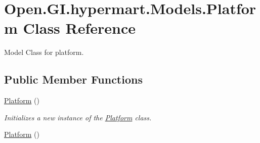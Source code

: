 \hypertarget{class_open_1_1_g_i_1_1hypermart_1_1_models_1_1_platform}{}\section{Open.\+G\+I.\+hypermart.\+Models.\+Platform Class Reference}
\label{class_open_1_1_g_i_1_1hypermart_1_1_models_1_1_platform}


Model Class for platform.  


\subsection*{Public Member Functions}
\begin{DoxyCompactItemize}
\item 
\hyperlink{class_open_1_1_g_i_1_1hypermart_1_1_models_1_1_platform_a6c806705f4dc1171773096a5249a1563}{Platform} ()
\begin{DoxyCompactList}\small\item\em Initializes a new instance of the \hyperlink{class_open_1_1_g_i_1_1hypermart_1_1_models_1_1_platform}{Platform} class. \end{DoxyCompactList}\item 
\hyperlink{class_open_1_1_g_i_1_1hypermart_1_1_models_1_1_platform_a6c806705f4dc1171773096a5249a1563}{Platform} ()
\end{DoxyCompactItemize}
